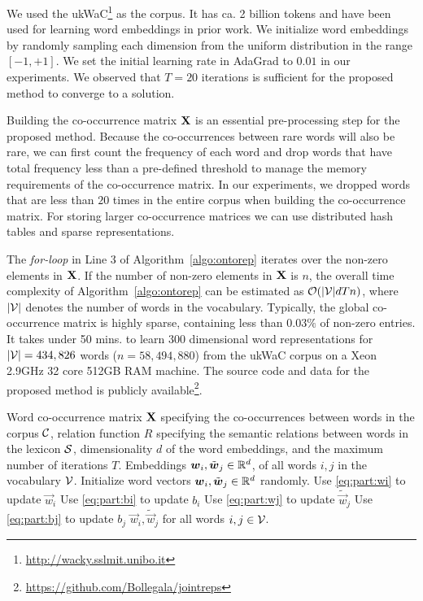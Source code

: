 \documentclass[letterpaper]{article}
\begin{document}
We used the ukWaC\footnote{\url{http://wacky.sslmit.unibo.it}} as the corpus.
It has ca. 2 billion tokens and have been used for learning word embeddings in prior work.
We initialize word embeddings by randomly sampling each dimension from the uniform distribution in the range $[-1,+1]$.
We set the initial learning rate in AdaGrad to $0.01$ in our experiments.
We observed that $T = 20$ iterations is sufficient for the proposed method to converge to a solution.

Building the co-occurrence matrix $\text{\bf X}$ is an essential pre-processing step for the proposed method.
Because the co-occurrences between rare words will also be rare, we can first count the frequency of each word and
drop words that have total frequency less than a pre-defined threshold to manage the memory requirements of the
co-occurrence matrix. In our experiments, we dropped words that are less than $20$ times in the entire corpus
when building the co-occurrence matrix.
For storing larger co-occurrence matrices we can use distributed hash tables and sparse representations.

The \emph{for-loop} in Line 3 of Algorithm~\ref{algo:ontorep} iterates over the non-zero
elements in $\text{\bf X}$. If the number of non-zero elements in $\text{\bf X}$ is $n$, the overall time complexity
of Algorithm~\ref{algo:ontorep} can be estimated as $\mathcal{O}(|\mathcal{V}|dTn)$, where $|\mathcal{V}|$ denotes the number of words
in the vocabulary.
Typically, the global co-occurrence matrix is highly sparse, containing less than $0.03\%$ of non-zero entries.
It takes under 50 mins. to learn $300$ dimensional word representations for $|\mathcal{V}| = 434,826$ words
($n = 58,494,880$) from the ukWaC corpus
on a Xeon 2.9GHz 32 core 512GB RAM machine.
The source code and data for the proposed method is publicly available\footnote{\url{https://github.com/Bollegala/jointreps}}.

\begin{algorithm}[t]
\small
\caption{Jointly learning word representations using a corpus and a semantic lexicon.}
\label{algo:ontorep}
\begin{algorithmic}[1]
\REQUIRE Word co-occurrence matrix $\text{\bf X}$ specifying the co-occurrences between words in the corpus $\mathcal{C}$,
relation function $R$ specifying the semantic relations between words in the lexicon $\mathcal{S}$,
dimensionality $d$ of the word embeddings, and the maximum number of iterations $T$.
\ENSURE Embeddings $\boldsymbol{w}_i, \tilde{\boldsymbol{w}}_j \in \mathbb{R}^d$, of all words $i, j$ in the vocabulary $\mathcal{V}$.
\medskip
\STATE Initialize word vectors $\boldsymbol{w}_i, \tilde{\boldsymbol{w}}_j \in \mathbb{R}^d$ randomly. \label{line:init}
\STATE Use \eqref{eq:part:wi} to update $\vec{w}_i$
\STATE Use \eqref{eq:part:bi} to update $b_i$
\STATE Use \eqref{eq:part:wj} to update $\tilde{\vec{w}}_j$
\STATE Use \eqref{eq:part:bj} to update $b_j$
\ENDFOR
\ENDFOR
\RETURN $\vec{w}_i, \tilde{\vec{w}}_j$ for all words $i,j \in \mathcal{V}$.
\end{algorithmic}
\end{algorithm}
\end{document}
